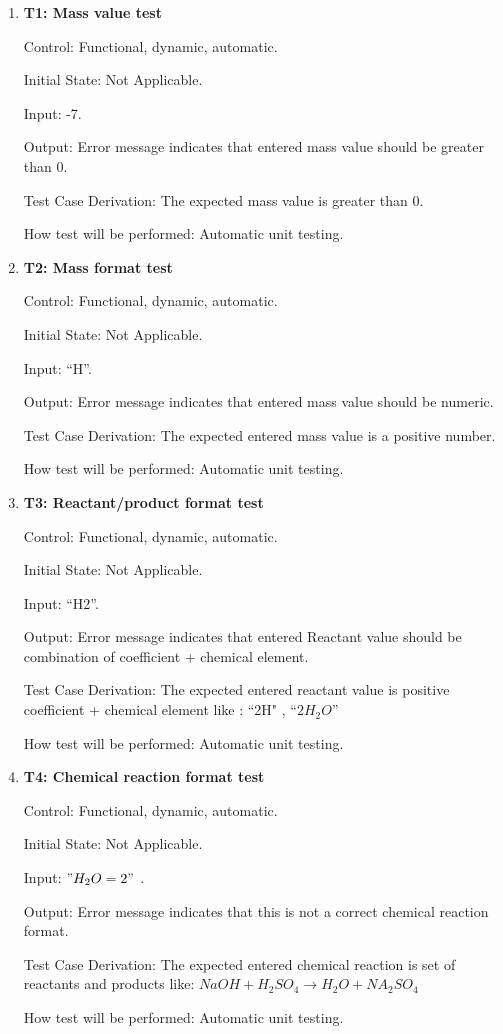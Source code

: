 \documentclass[12pt, titlepage]{article}
\begin{document}
\begin{enumerate}

\item{\bf T1: Mass value test\\}

Control: Functional, dynamic, automatic.
					
Initial State: Not Applicable.
					
Input: -7.
					
Output: Error message indicates that entered mass value should be greater than
0.

Test Case Derivation: The expected mass value is greater than 0.
					
How test will be performed: Automatic unit testing.

\item{\bf T2: Mass format test\\}

Control: Functional, dynamic, automatic.
					
Initial State: Not Applicable.
					
Input: ``H''.
					
Output: Error message indicates that entered mass value should be numeric.

Test Case Derivation: The expected entered mass value is a positive number.
					
How test will be performed: Automatic unit testing.

\item{\bf T3: Reactant/product format test\\}

Control: Functional, dynamic, automatic.
					
Initial State: Not Applicable.
					
Input: ``H2''.
					
Output: Error message indicates that entered Reactant value should be
combination of coefficient + chemical element.

Test Case Derivation: The expected entered reactant value is positive
coefficient + chemical element like : ``2H" , ``$2H_2O$''
					
How test will be performed: Automatic unit testing.


\item{\bf T4: Chemical reaction format test\\}

Control: Functional, dynamic, automatic.
					
Initial State: Not Applicable.
					
Input: $"H_2O = 2"$ .
					
Output: Error message indicates that this is not a correct chemical reaction
format.

Test Case Derivation: The expected entered chemical reaction is set of reactants
and products like: $NaOH + H_2SO_4 \rightarrow H_2O + NA_2SO_4$
					
How test will be performed: Automatic unit testing.
 
\end{enumerate}
\end{document}
